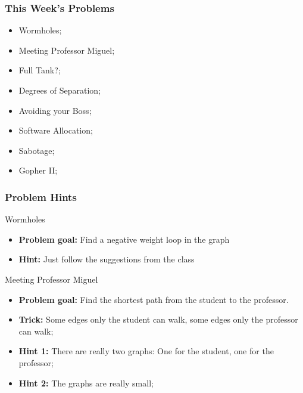 \begin{frame}
  \frametitle{This Week's Problems}
  \begin{itemize}
  \item Wormholes;
  \item Meeting Professor Miguel;
  \item Full Tank?;
  \item Degrees of Separation;
  \item Avoiding your Boss;
  \item Software Allocation;
  \item Sabotage;
  \item Gopher II;
  \end{itemize}
\end{frame}

\begin{frame}
  \frametitle{Problem Hints}
  \begin{block}{Wormholes}
    \begin{itemize}
    \item {\bf Problem goal:} Find a negative weight loop in the graph
    \item {\bf Hint:} Just follow the suggestions from the class
    \end{itemize}
  \end{block}

  \begin{exampleblock}{Meeting Professor Miguel}
    \begin{itemize}
    \item {\bf Problem goal:} Find the shortest path from the student to the professor.
    \item {\bf Trick:} Some edges only the student can walk, some
      edges only the professor can walk;
    \item {\bf Hint 1:} There are really two graphs: One for the student, one for the
      professor;
    \item {\bf Hint 2:} The graphs are really small;
    \end{itemize}
  \end{exampleblock}
\end{frame}  

